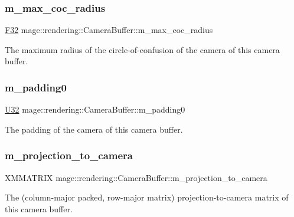 \subsubsection{\texorpdfstring{m\+\_\+max\+\_\+coc\+\_\+radius}{m\_max\_coc\_radius}}
{\footnotesize\ttfamily \hyperlink{namespacemage_aa97e833b45f06d60a0a9c4fc22ae02c0}{F32} mage\+::rendering\+::\+Camera\+Buffer\+::m\+\_\+max\+\_\+coc\+\_\+radius}

The maximum radius of the circle-\/of-\/confusion of the camera of this camera buffer. \hypertarget{structmage_1_1rendering_1_1_camera_buffer_a253bf6bedadf6fa508172ed5efe2e6d7}{}\label{structmage_1_1rendering_1_1_camera_buffer_a253bf6bedadf6fa508172ed5efe2e6d7} 
\subsubsection{\texorpdfstring{m\+\_\+padding0}{m\_padding0}}
{\footnotesize\ttfamily \hyperlink{namespacemage_a41c104c036fba3756a74e19f793eeaa1}{U32} mage\+::rendering\+::\+Camera\+Buffer\+::m\+\_\+padding0}

The padding of the camera of this camera buffer. \hypertarget{structmage_1_1rendering_1_1_camera_buffer_a9cb9e0e4005d55b72668bbdcf4a27218}{}\label{structmage_1_1rendering_1_1_camera_buffer_a9cb9e0e4005d55b72668bbdcf4a27218} 
\subsubsection{\texorpdfstring{m\+\_\+projection\+\_\+to\+\_\+camera}{m\_projection\_to\_camera}}
{\footnotesize\ttfamily X\+M\+M\+A\+T\+R\+IX mage\+::rendering\+::\+Camera\+Buffer\+::m\+\_\+projection\+\_\+to\+\_\+camera}

The (column-\/major packed, row-\/major matrix) projection-\/to-\/camera matrix of this camera buffer. \hypertarget{structmage_1_1rendering_1_1_camera_buffer_a05e17b19f87ca2a5cb5c75cf04e2796c}{}\label{structmage_1_1rendering_1_1_camera_buffer_a05e17b19f87ca2a5cb5c75cf04e2796c} 
